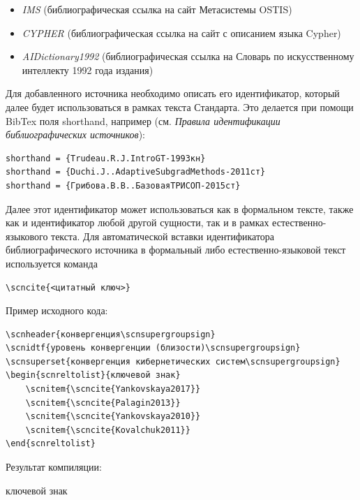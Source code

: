 \begin{itemize}
	\begin{itemize}
		\item \textit{IMS} (библиографическая ссылка на сайт Метасистемы OSTIS)
		\item \textit{CYPHER} (библиографическая ссылка на сайт с описанием языка Cypher)
		\item \textit{AIDictionary1992} (библиографическая ссылка на Словарь по искусственному интеллекту 1992 года издания)
	\end{itemize}

Для добавленного источника необходимо описать его идентификатор, который далее будет использоваться в рамках текста Стандарта. Это делается при помощи BibTex поля shorthand, например (см. \textit{Правила идентификации библиографических источников}):

\begin{verbatim}
shorthand = {Trudeau.R.J.IntroGT-1993кн}
shorthand = {Duchi.J..AdaptiveSubgradMethods-2011ст}
shorthand = {Грибова.В.В..БазоваяТРИСОП-2015ст}
\end{verbatim}

Далее этот идентификатор может использоваться как в формальном тексте, также как и идентификатор любой другой сущности, так и в рамках естественно-языкового текста. Для автоматической вставки идентификатора библиографического источника в формальный либо естественно-языковой текст используется команда \begin{verbatim}\scncite{<цитатный ключ>}\end{verbatim}

Пример исходного кода:

\begin{verbatim}
\scnheader{конвергенция\scnsupergroupsign}
\scnidtf{уровень конвергенции (близости)\scnsupergroupsign}
\scnsuperset{конвергенция кибернетических систем\scnsupergroupsign}
\begin{scnreltolist}{ключевой знак}
	\scnitem{\scncite{Yankovskaya2017}}
	\scnitem{\scncite{Palagin2013}}
	\scnitem{\scncite{Yankovskaya2010}}
	\scnitem{\scncite{Kovalchuk2011}}
\end{scnreltolist}		
\end{verbatim}

Результат компиляции:

\begin{SCn}
\begin{scnreltolist}{ключевой знак}
\end{scnreltolist}
\end{SCn}


\end{itemize}
